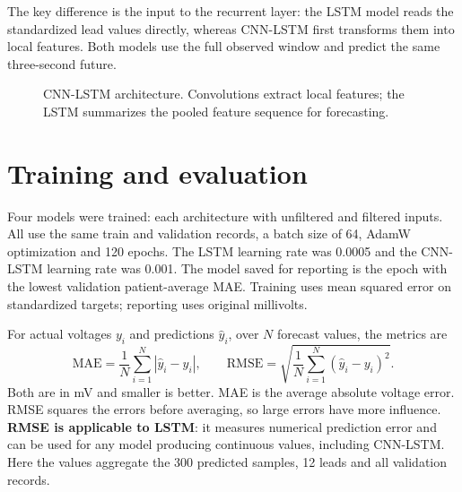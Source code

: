 \documentclass[11pt,a4paper]{article}
\begin{document}
The key difference is the input to the recurrent layer: the LSTM model reads the standardized lead values directly, whereas CNN-LSTM first transforms them into local features. Both models use the full observed window and predict the same three-second future.
\begin{figure}[H]
\centering
{}
\caption{CNN-LSTM architecture. Convolutions extract local features; the LSTM summarizes the pooled feature sequence for forecasting.}
\label{fig:cnn_arch}
\end{figure}

\section{Training and evaluation}
Four models were trained: each architecture with unfiltered and filtered inputs. All use the same train and validation records, a batch size of 64, AdamW optimization and 120 epochs. The LSTM learning rate was 0.0005 and the CNN-LSTM learning rate was 0.001. The model saved for reporting is the epoch with the lowest validation patient-average MAE. Training uses mean squared error on standardized targets; reporting uses original millivolts.

For actual voltages $y_i$ and predictions $\widehat y_i$, over $N$ forecast values, the metrics are
\begin{equation}
 \mathrm{MAE}=\frac{1}{N}\sum_{i=1}^{N}|\widehat y_i-y_i|,
 \qquad
 \mathrm{RMSE}=\sqrt{\frac{1}{N}\sum_{i=1}^{N}(\widehat y_i-y_i)^2}.
\end{equation}
Both are in mV and smaller is better. MAE is the average absolute voltage error. RMSE squares the errors before averaging, so large errors have more influence. \textbf{RMSE is applicable to LSTM}: it measures numerical prediction error and can be used for any model producing continuous values, including CNN-LSTM. Here the values aggregate the 300 predicted samples, 12 leads and all validation records.
\end{document}
